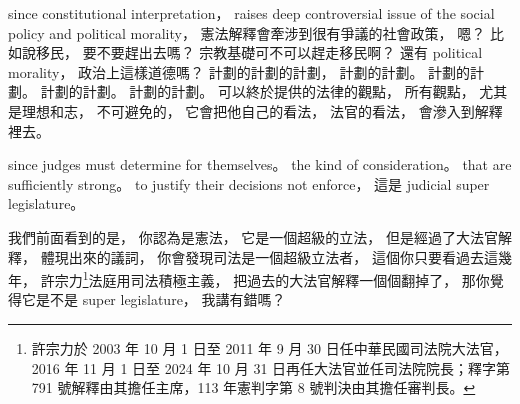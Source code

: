 \hypertarget{w02:cue:2276}{}since constitutional interpretation，
\hypertarget{w02:cue:2277}{}raises deep controversial issue of the social policy and political morality，
\hypertarget{w02:cue:2278}{}憲法解釋會牽涉到很有爭議的社會政策，
\hypertarget{w02:cue:2279}{}嗯？
\hypertarget{w02:cue:2280}{}比如說移民，
\hypertarget{w02:cue:2281}{}要不要趕出去嗎？
\hypertarget{w02:cue:2282}{}宗教基礎可不可以趕走移民啊？
\hypertarget{w02:cue:2283}{}還有 political morality，
\hypertarget{w02:cue:2284}{}政治上這樣道德嗎？
\hypertarget{w02:cue:2285}{}計劃的計劃的計劃，
\hypertarget{w02:cue:2286}{}計劃的計劃。
\hypertarget{w02:cue:2287}{}計劃的計劃。
\hypertarget{w02:cue:2288}{}計劃的計劃。
\hypertarget{w02:cue:2289}{}計劃的計劃。
\hypertarget{w02:cue:2290}{}可以終於提供的法律的觀點，
\hypertarget{w02:cue:2291}{}所有觀點，
\hypertarget{w02:cue:2292}{}尤其是理想和志，
\hypertarget{w02:cue:2293}{}不可避免的，
\hypertarget{w02:cue:2294}{}它會把他自己的看法，
\hypertarget{w02:cue:2295}{}法官的看法，
\hypertarget{w02:cue:2296}{}會滲入到解釋裡去。

\hypertarget{w02:cue:2297}{}since judges must determine for themselves。
\hypertarget{w02:cue:2298}{}the kind of consideration。
\hypertarget{w02:cue:2299}{}that are sufficiently strong。
\hypertarget{w02:cue:2300}{}to justify their decisions not enforce，
\hypertarget{w02:cue:2301}{}這是 judicial super legislature。

\hypertarget{w02:cue:2302}{}我們前面看到的是，
\hypertarget{w02:cue:2303}{}你認為是憲法，
\hypertarget{w02:cue:2304}{}它是一個超級的立法，
\hypertarget{w02:cue:2305}{}但是經過了大法官解釋，
\hypertarget{w02:cue:2306}{}體現出來的議詞，
\hypertarget{w02:cue:2307}{}你會發現司法是一個超級立法者，
\hypertarget{w02:cue:2308}{}這個你只要看過去這幾年，
\hypertarget{w02:cue:2309}{}許宗力\footnote{許宗力於 2003 年 10 月 1 日至 2011 年 9 月 30 日任中華民國司法院大法官，2016 年 11 月 1 日至 2024 年 10 月 31 日再任大法官並任司法院院長；釋字第 791 號解釋由其擔任主席，113 年憲判字第 8 號判決由其擔任審判長。}法庭用司法積極主義，
\hypertarget{w02:cue:2310}{}把過去的大法官解釋一個個翻掉了，
\hypertarget{w02:cue:2311}{}那你覺得它是不是 super legislature，
\hypertarget{w02:cue:2312}{}我講有錯嗎？

